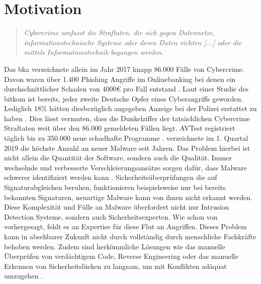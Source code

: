 \documentclass[
    12pt, %
    DIV10,
    ngerman, %
    a4paper, %
    oneside, %
    titlepage, %
    parskip=half, %
    headings=normal, %
    listof=totoc, %
    bibliography=totoc, %
    index=totoc, %
    captions=tableheading, %
    final %
]{scrreprt}
\begin{document}
\section{Motivation}\label{sec:mot}
\begin{quote}
\textsl{Cybercrime umfasst die Straftaten, die sich gegen Datennetze, informationstechnische Systeme
oder deren Daten richten [...] oder die mittels Informationstechnik
begangen werden. \parencite{Cybercrime2017}}
\end{quote}
Das \ac{bka} verzeichnete allein im Jahr 2017 knapp 86.000 Fälle von Cybercrime. Davon waren über 1.400 Phishing Angriffe im Onlinebanking bei denen ein durchschnittlicher Schaden von 4000\euro{} pro Fall entstand \parencite{Cybercrime2017}. Laut einer Studie des \ac{bitkom} ist bereits, jeder zweite Deutsche Opfer eines Cyberangriffs geworden. Lediglich 18\% hätten diesbezüglich angegeben Anzeige bei der Polizei erstattet zu haben \parencite{Bitkome.V.2017}. Dies lässt vermuten, dass die Dunkelziffer der tatsächlichen Cybercrime Straftaten weit über den 86.000 gemeldeten Fällen liegt. AVTest registriert täglich bis zu 350.000 neue schadhafte Programme \parencite{AV-TEST2019}. \textcite{McAfee2019} verzeichnete im 1. Quartal 2019 die höchste Anzahl an neuer Malware seit Jahren. Das Problem hierbei ist nicht allein die Quantität der Software, sondern auch die Qualität. Immer wechselnde und verbesserte Verschleierungsansätze sorgen dafür, dass Malware schwerer identifiziert werden kann \parencite{he2017model}. Sicherheitsüberprüfungen die auf Signaturabgleichen beruhen, funktionieren beispielsweise nur bei bereits bekannten Signaturen, neuartige Malware kann von ihnen nicht erkannt werden. Diese Komplexität und Fülle an Malware überfordert nicht nur Intrusion Detection Systeme, sondern auch Sicherheitsexperten. Wie schon von \textcite{Evans2010} vorhergesagt, fehlt es an Expertise für diese Flut an Angriffen. Dieses Problem kann in absehbarer Zukunft nicht durch vollständig durch menschliche Fachkräfte behoben werden. Zudem sind herkömmliche Lösungen wie das manuelle Überprüfen von verdächtigem Code, Reverse Engineering oder das manuelle Erkennen von Sicherheitslücken zu langsam, um mit Konflikten adäquat umzugehen \parencite{Singla2019}.
\\\\ 
\end{document}
